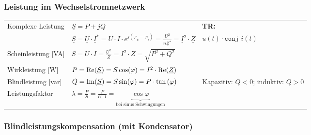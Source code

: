 		\subsubsection{Leistung im Wechselstromnetzwerk}%
				\begin{tabular}{p{4cm}p{7cm}p{7cm}}
					\multirow{2}{4cm}{Komplexe Leistung}  &
						$ \underline{S} = P + jQ$  & \textbf{TR:}\\
						& $ \underline{S} = \underline{U} \cdot \underline{I}^\ast = U\cdot I \cdot e^{j(\varphi_u-\varphi_i)} = \frac{\underline{U}^2}{n\underline{Z}^*} = \underline{I}^2 \cdot \underline{Z}$ & $u(t)\cdot \texttt{conj } i(t)$ 
						\\
					Scheinleistung [VA]	& $ S = U\cdot I = \frac{U^2}{Z} 
						= I^2 \cdot Z = \sqrt{P^2+Q^2}$& \\
					Wirkleistung [W] &
						$ P = \operatorname{Re}(\underline{S}) = S \cos(\varphi) = I^2 \cdot \operatorname{Re}(\underline{Z}) $ \\
					Blindleistung [var] &
						$ Q = \operatorname{Im}(\underline{S}) = S \sin(\varphi)  = P \cdot
						\tan\left(\varphi\right)$ & Kapazitiv: $Q < 0$; induktiv: $Q > 0$ \\
					Leistungsfaktor &
						$\lambda = \frac{P}{S} = \frac{P}{U\cdot I} = \underbrace{\cos \varphi}_{\text{bei sinus Schwingungen}}$ \\
				\end{tabular}
		\renewcommand{\arraystretch}{1}
		
		\subsubsection{Blindleistungskompensation (mit Kondensator)}


